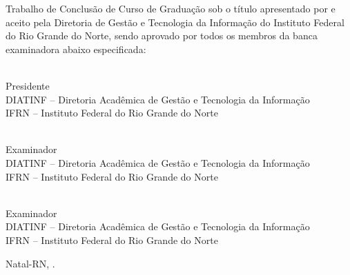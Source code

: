 \begin{folhadeaprovacao}
	\setlength{\ABNTsignthickness}{0.4pt}
	\setlength{\ABNTsignwidth}{10cm}

	\noindent
	Trabalho de Conclusão de Curso de Graduação sob o título
	\textit{\myThesis} apresentado por \myName{} e aceito pela Diretoria
	de Gestão e Tecnologia da Informação do Instituto Federal do Rio Grande do
	Norte, sendo aprovado por todos os membros da banca examinadora abaixo especificada:

	\assinatura
	{
	{\mySupervisorName}   			                  \\
	{\small Presidente}											          \smallskip\\
	{\footnotesize
	DIATINF -- Diretoria Acadêmica de Gestão e Tecnologia da Informação		   \\
	IFRN -- Instituto Federal do Rio Grande do Norte
	}
	}

	\assinatura
	{
	\myFirstExaminerName   			                  \\
	{\small Examinador}											          \smallskip\\
	{\footnotesize
	DIATINF -- Diretoria Acadêmica de Gestão e Tecnologia da Informação		   \\
	IFRN -- Instituto Federal do Rio Grande do Norte
	}
	}

	\assinatura
	{
	\mySecondExaminerName   			                  \\
	{\small Examinador}											          \smallskip\\
	{\footnotesize
	DIATINF -- Diretoria Acadêmica de Gestão e Tecnologia da Informação		   \\
	IFRN -- Instituto Federal do Rio Grande do Norte
	}
	}

	\vfill

	\begin{center}
		Natal-RN, \myDefenseDate.
	\end{center}
\end{folhadeaprovacao}
